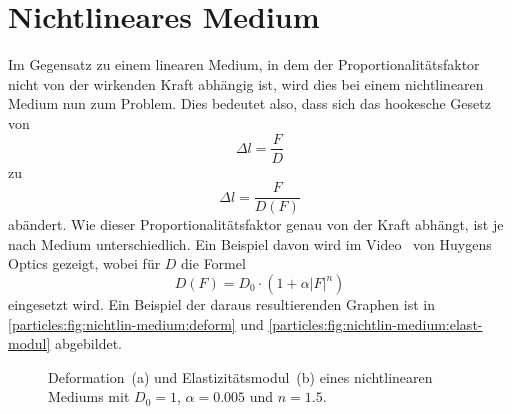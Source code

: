 %
%
%
%
\section{Nichtlineares Medium
\label{particles:section:nichtlinear}}
Im Gegensatz zu einem linearen Medium, in dem der Proportionalitätsfaktor nicht von der wirkenden Kraft abhängig ist, 
wird dies bei einem nichtlinearen Medium nun zum Problem.
Dies bedeutet also, dass sich das hookesche Gesetz von 
\[
    \Delta l
    = 
    \frac{F}{D}
\]
zu
\[
    \Delta l
    = 
    \frac{F}{D(F)}
\]
abändert. 
Wie dieser Proportionalitätsfaktor genau von der Kraft abhängt, ist je nach Medium unterschiedlich.
Ein Beispiel davon wird im Video~\cite{particles:huygens-optics} von Huygens Optics gezeigt, wobei für $D$ die Formel 
\[
    D(F)
    =
    D_0
    \cdot
    (1 + \alpha |F|^n)
\]
eingesetzt wird. Ein Beispiel der daraus resultierenden Graphen ist in \autoref{particles:fig:nichtlin-medium:deform} und \autoref{particles:fig:nichtlin-medium:elast-modul} abgebildet.
\begin{figure}
    \centering
    \hfill
    \caption{Deformation~(a) und Elastizitätsmodul~(b) eines nichtlinearen Mediums mit $D_0 = 1$, $\alpha = 0.005$ und $n = 1.5$.}
\end{figure}

